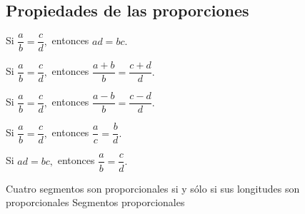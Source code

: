     \subsection{Propiedades de las proporciones}
\begin{lista}
\item Si $\dfrac{a}{b}=\dfrac{c}{d}, $ entonces $ad=bc.$
\item Si $\dfrac{a}{b}=\dfrac{c}{d}, $ entonces $\dfrac{a+b}{b}=\dfrac{c+d}{d}.$
\item Si $\dfrac{a}{b}=\dfrac{c}{d}, $ entonces $\dfrac{a-b}{b}=\dfrac{c-d}{d}.
$
\item Si $\dfrac{a}{b}=\dfrac{c}{d}, $ entonces $\dfrac{a}{c}=\dfrac{b}{d}. $
\item Si $ad=bc, $ entonces $\dfrac{a}{b}=\dfrac{c}{d}. $
\end{lista}
\begin{definicion}{
Cuatro segmentos son proporcionales si y s\'olo si sus longitudes son
proporcionales
}{Segmentos proporcionales}
 
\end{definicion}

